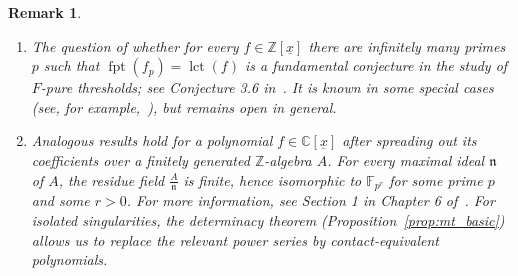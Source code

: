 \documentclass{article}
\newtheorem{remark}[theorem]{Remark}
\DeclareMathOperator{\fpt}{fpt}
\DeclareMathOperator{\lct}{lct}
\numberwithin{theorem}{section}
\begin{document}
\begin{remark}
\begin{enumerate}
    \item \textup{The question of whether for every $f\in\mathbb{Z}[\underline{x}]$ there are infinitely many primes $p$ such that $\fpt(f_p)=\lct(f)$ is a fundamental conjecture in the study of $F$-pure thresholds; see Conjecture 3.6 in~\cite{mustata2005f}. It is known in some special cases (see, for example,~\cite{hernandez2016f,hernandez2011f,fedder1983F,smith1997vanishing,ein2007invariants}), but remains open in general.}
    \item \textup{Analogous results hold for a polynomial $f\in\mathbb{C}[\underline{x}]$ after spreading out its coefficients over a finitely generated $\mathbb{Z}$-algebra $A$. For every maximal ideal $\mathfrak n$ of $A$, the residue field $\frac{A}{\mathfrak n}$ is finite, hence isomorphic to $\mathbb{F}_{p^r}$ for some prime $p$ and some $r>0$. For more information, see Section 1 in Chapter 6 of~\cite{schwede2024singularities}. For isolated singularities, the determinacy theorem (Proposition~\ref{prop:mt_basic}) allows us to replace the relevant power series by contact-equivalent polynomials.}
\end{enumerate}
\end{remark}



\end{document}
